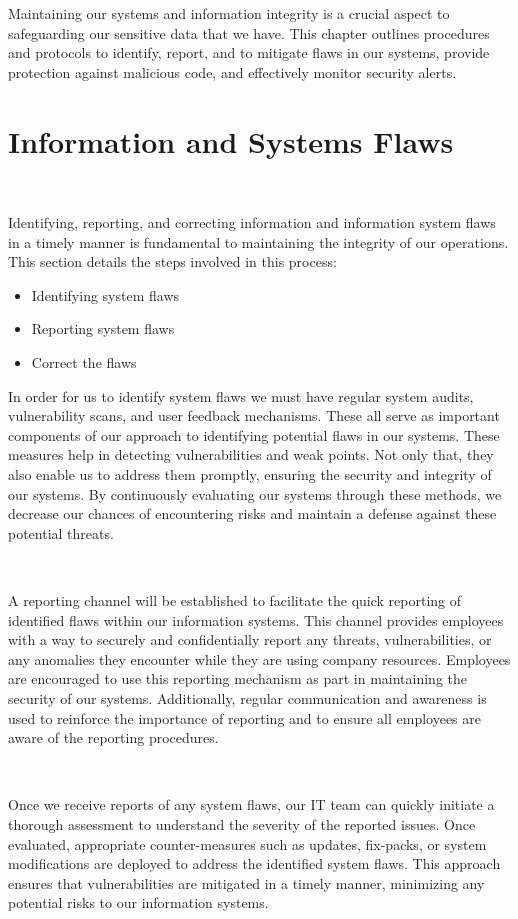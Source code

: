 \documentclass[12pt,a4paper]{report}
\begin{document}
Maintaining our systems and information integrity is a crucial aspect to safeguarding our sensitive data that we have.
This chapter outlines procedures and protocols to identify, report, and to mitigate flaws in our systems, provide protection against malicious code, and effectively monitor security alerts.

\section{Information and Systems Flaws}
\

Identifying, reporting, and correcting information and information system flaws in a timely manner is fundamental to maintaining the integrity of our operations. 
This section details the steps involved in this process:
\begin{itemize}
 \item Identifying system flaws
 \item Reporting system flaws
 \item Correct the flaws
\end{itemize}

In order for us to identify system flaws we must have regular system audits, vulnerability scans, and user feedback mechanisms.
These all serve as important components of our approach to identifying potential flaws in our systems.
These measures help in detecting vulnerabilities and weak points.
Not only that, they also enable us to address them promptly, ensuring the security and integrity of our systems.
By continuously evaluating our systems through these methods, we decrease our chances of encountering risks and maintain a defense against these potential threats.

\

A reporting channel will be established to facilitate the quick reporting of identified flaws within our information systems. 
This channel provides employees with a way to securely and confidentially report any threats, vulnerabilities, or any anomalies they encounter while they are using company resources.
Employees are encouraged to use this reporting mechanism as part in maintaining the security of our systems. 
Additionally, regular communication and awareness is used to reinforce the importance of reporting and to ensure all employees are aware of the reporting procedures.

\

Once we receive reports of any system flaws, our IT team can quickly initiate a thorough assessment to understand the severity of the reported issues.
Once evaluated, appropriate counter-measures such as updates, fix-packs, or system modifications are deployed to address the identified system flaws. 
This approach ensures that vulnerabilities are mitigated in a timely manner, minimizing any potential risks to our information systems.
\end{document}
